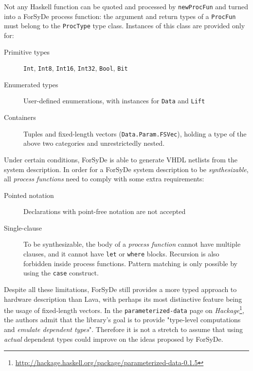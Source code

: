             Not any Haskell function can be quoted and processed by \texttt{newProcFun}
            and turned into a ForSyDe process function:
            the argument and return types of a \texttt{ProcFun} must belong
            to the \texttt{ProcType} type class.
            Instances of this class are provided only for:

            \begin{description}
                \item[Primitive types] \texttt{Int}, \texttt{Int8}, \texttt{Int16},
                    \texttt{Int32}, \texttt{Bool}, \texttt{Bit}
                \item[Enumerated types] User-defined enumerations,
                    with instances for \texttt{Data} and \texttt{Lift}
                \item[Containers] Tuples and fixed-length vectors (\texttt{Data.Param.FSVec}),
                    holding a type of the above two categories and unrestrictedly nested.
            \end{description}

            Under certain conditions, ForSyDe is able to generate \ac{VHDL} netlists from the system description.
            In order for a ForSyDe system description to be \emph{synthesizable},
            all \emph{process functions} need to comply with some extra requirements:

            \begin{description}
                \item[Pointed notation] Declarations with point-free notation are not accepted
                \item[Single-clause] To be synthesizable,
                    the body of a \emph{process function} cannot have multiple clauses,
                    and it cannot have \texttt{let} or \texttt{where} blocks.
                    Recursion is also forbidden inside process functions.
                    Pattern matching is only possible by using the \texttt{case} construct.
            \end{description}

            Despite all these limitations,
            ForSyDe still provides a more typed approach to hardware description than Lava,
            with perhaps its most distinctive feature being the usage of fixed-length vectors.
            In the \texttt{parameterized-data} page on
            \emph{Hackage}\footnote{\url{http://hackage.haskell.org/package/parameterized-data-0.1.5}},
            the authors admit that the library's goal is to provide
            "type-level computations and \emph{emulate dependent types}".
            Therefore it is not a stretch to assume that using \emph{actual} dependent types
            could improve on the ideas proposed by ForSyDe.


